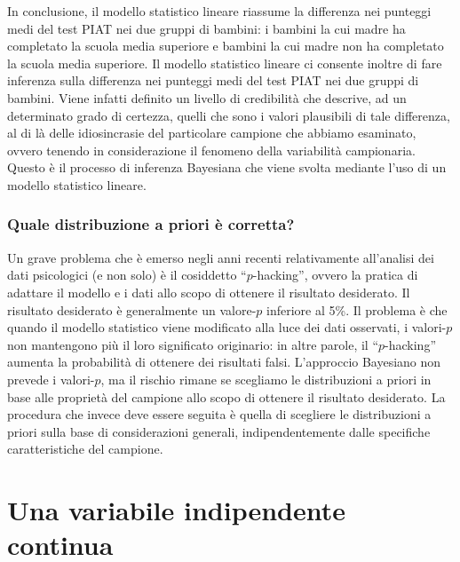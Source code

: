 In conclusione, il modello statistico lineare riassume la differenza nei punteggi medi del test PIAT nei due gruppi di bambini: i bambini la cui madre ha completato la scuola media superiore e bambini la cui madre non ha completato la scuola media superiore.
Il modello statistico lineare ci consente inoltre di fare inferenza sulla differenza nei punteggi medi del test PIAT nei due gruppi di bambini.
Viene infatti definito un livello di credibilità che descrive, ad un determinato grado di certezza, quelli che sono i valori plausibili di tale differenza, al di là delle idiosincrasie del particolare campione che abbiamo esaminato, ovvero tenendo in considerazione il fenomeno della variabilità campionaria.
Questo è il processo di inferenza Bayesiana che viene svolta mediante l'uso di un modello statistico lineare.


\subsubsection{Quale distribuzione a priori è corretta?}
Un grave problema che è emerso negli anni recenti relativamente all'analisi dei dati psicologici (e non solo) è il cosiddetto \enquote{$p$-hacking}, ovvero la pratica di adattare il modello e i dati allo scopo di ottenere il risultato desiderato. 
Il risultato desiderato è generalmente un valore-$p$ inferiore al 5\%. 
Il problema è che quando il modello statistico viene modificato alla luce dei dati osservati, i valori-$p$ non mantengono più il loro significato originario: in altre parole, il \enquote{$p$-hacking} aumenta la probabilità di ottenere dei risultati falsi. 
L'approccio Bayesiano non prevede i valori-$p$, ma il rischio rimane se scegliamo le distribuzioni a priori in base alle proprietà del campione allo scopo di ottenere il risultato desiderato. 
La procedura che invece deve essere seguita è quella di scegliere le distribuzioni a priori sulla base di considerazioni generali, indipendentemente dalle specifiche caratteristiche del campione.


\section{Una variabile indipendente continua}
\label{sec_var_ind_dico}

